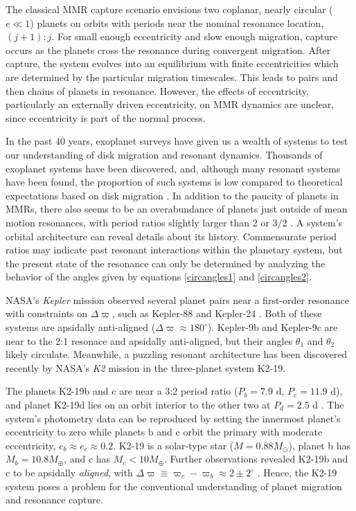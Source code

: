 \documentclass[usenatbib,twocolumn]{mnras}
\begin{document}
The classical MMR capture scenario envisions two coplanar, nearly
circular (\(e\ll 1\)) planets on orbits with periods near the nominal
resonance location, \((j+1):j\). For small enough eccentricity and slow
enough migration, capture occurs as the planets cross the resonance
during convergent migration.  After capture, the system evolves into
an equilibrium with finite eccentricities which are determined by the
particular migration timescales.  This leads to pairs and then chains
of planets in resonance.  However, the effects of eccentricity,
particularly an externally driven eccentricity, on MMR dynamics are
unclear, since eccentricity is part of the normal process.

In the past 40 years, exoplanet surveys have given us a wealth of
systems to test our understanding of disk migration and resonant
dynamics.  Thousands of exoplanet systems have been discovered, and,
although many resonant systems have been found, the proportion of such
systems is low compared to theoretical expectations based on disk
migration \citep{fabrycky_architecture_2014}.  In addition to the paucity
of planets in MMRs, there also seems to be an overabundance of planets
just outside of mean motion resonances, with period ratios slightly
larger than 2 or 3/2
\citep{fabrycky_architecture_2014,choksi_sub-neptune_2020}.  A system's
orbital architecture can reveal details about its history.
Commensurate period ratios may indicate past resonant interactions
within the planetary system, but the present state of the resonance
can only be determined by analyzing the behavior of the angles given by
equations \eqref{circangles1} and \eqref{circangles2}.  

NASA's \emph{Kepler} mission observed several planet pairs near a
first-order resonance with constraints on \(\Delta\varpi\), such as
Kepler-88 \citep{weiss_discovery_2020} and Kepler-24
\citep{antoniadou_exploiting_2020}. Both of these systems are apsidally
anti-aligned (\(\Delta\varpi\approx180^\circ\)).  Kepler-9b and
Kepler-9c are near to the 2:1 resonace and apsidally anti-aligned, but
their angles \(\theta_1\) and \(\theta_2\) likely circulate.
Meanwhile, a
puzzling resonant architecture has been discovered recently
by NASA's \emph{K2} mission in the
three-planet system K2-19.

The planets K2-19b and c are near a 3:2 period ratio (\(P_b=7.9\) d,
\(P_c=11.9\) d), and planet K2-19d lies on an orbit interior to the
other two at \(P_d=2.5\) d
\citep{howell14_k2_mission,armstrong15_one_closes_exopl_pairs_to,sinukoff16_eleven_multip_system_fromk_masses}.
The system's photometry data can be reproduced by setting the
innermost planet's eccentricity to zero while planets b and c orbit
the primary with moderate eccentricity, \(e_b\approx e_c \approx 0.2\).
K2-19 is a solar-type star
(\(M=0.88M_\odot\)), planet b has \(M_{b}=10.8 M_{\oplus}\), and c has
\(M_{c}<10M_{\oplus}\).  Further observations revealed K2-19b and
c to be apsidally \emph{aligned}, with \(\Delta\varpi\equiv
\varpi_c-\varpi_b \approx 2\pm 2^\circ\) \citep{petigura_k2-19b_2020}.
Hence, the K2-19 system poses a problem for the conventional
understanding of planet migration and resonance capture.
\end{document}
